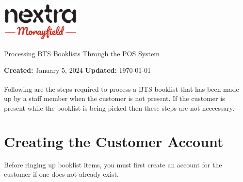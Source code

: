 \documentclass[a4paper, 12pt]{article}
\let\Huge\headingfont
\begin{document}
\begin{titlepage}
	\begin{minipage}[t]{1\columnwidth}
		\begin{flushright}
       	\vspace{-0.6in}
       	\includegraphics[width=0.3\textwidth]{MonextraNew.png}
			\vspace{0.5in}
		\par\end{flushright}
	\end{minipage}

	\begin{center}
		{\Huge Processing BTS Booklists Through the POS System}
	\end{center}
	\vspace{2em}
	\noindent
	\textbf{Created:} January 5, 2024
	\hfill
	\textbf{Updated:} \today
	\\\\\indent
	Following are the steps required to process a BTS booklist that has been 	made up by a staff member when the customer is not present. If the 	customer is present while the booklist is being picked then these steps 	are not neccessary.
	
	\tableofcontents
\end{titlepage}

\section{Creating the Customer Account}
Before ringing up booklist items, you must first create an account for the customer if one does not already exist.
\end{document}

